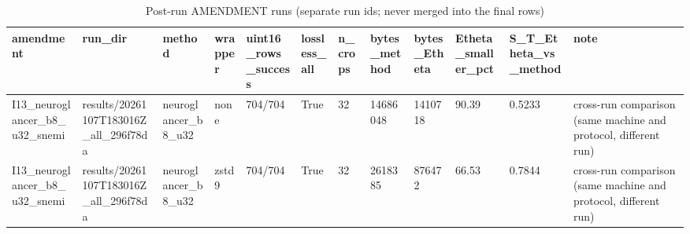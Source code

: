 \begin{table}[t]\centering\scriptsize
\caption{Post-run AMENDMENT runs (separate run ids; never merged into the final rows)}\label{tab:T09}
\begin{tabular}{llllllllllll}
\hline
amendment & run\_dir & method & wrapper & uint16\_rows\_success & lossless\_all & n\_crops & bytes\_method & bytes\_Etheta & Etheta\_smaller\_pct & S\_T\_Etheta\_vs\_method & note \\ \hline
I13\_neuroglancer\_b8\_u32\_snemi & results/20261107T183016Z\_all\_296f78da & neuroglancer\_b8\_u32 & none & 704/704 & True & 32 & 14686048 & 1410718 & 90.39 & 0.5233 & cross-run comparison (same machine and protocol, different run) \\
I13\_neuroglancer\_b8\_u32\_snemi & results/20261107T183016Z\_all\_296f78da & neuroglancer\_b8\_u32 & zstd9 & 704/704 & True & 32 & 2618385 & 876472 & 66.53 & 0.7844 & cross-run comparison (same machine and protocol, different run) \\
\hline
\end{tabular}
\end{table}
